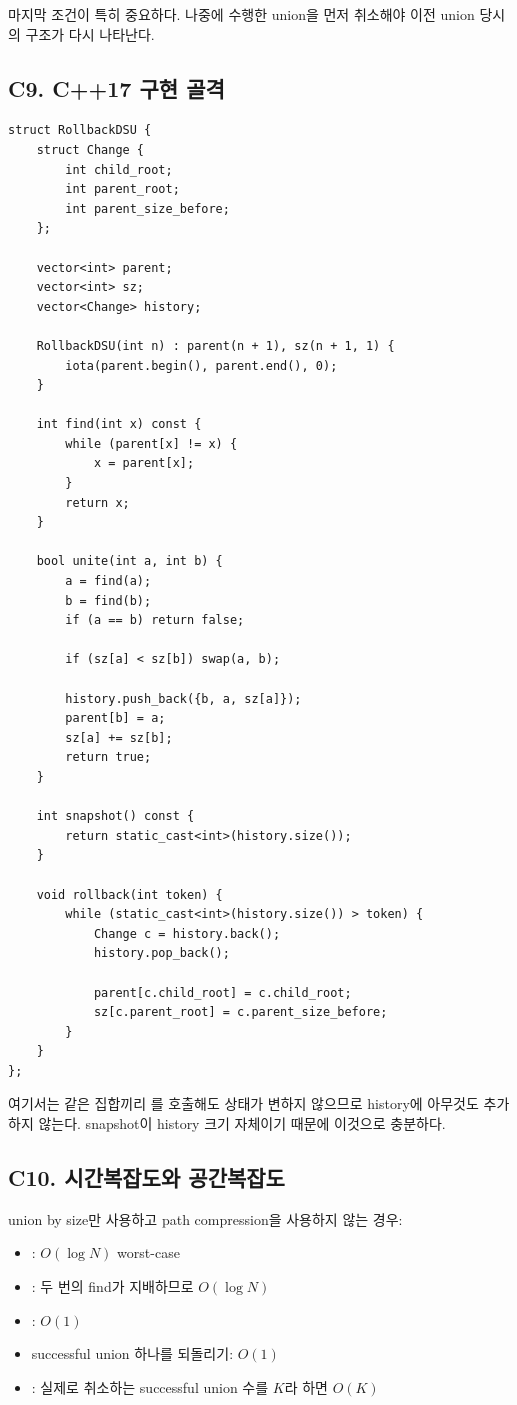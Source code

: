 마지막 조건이 특히 중요하다. 나중에 수행한 union을 먼저 취소해야 이전 union 당시의 구조가 다시 나타난다.

\subsection{C9. C++17 구현 골격}
\begin{lstlisting}
struct RollbackDSU {
    struct Change {
        int child_root;
        int parent_root;
        int parent_size_before;
    };

    vector<int> parent;
    vector<int> sz;
    vector<Change> history;

    RollbackDSU(int n) : parent(n + 1), sz(n + 1, 1) {
        iota(parent.begin(), parent.end(), 0);
    }

    int find(int x) const {
        while (parent[x] != x) {
            x = parent[x];
        }
        return x;
    }

    bool unite(int a, int b) {
        a = find(a);
        b = find(b);
        if (a == b) return false;

        if (sz[a] < sz[b]) swap(a, b);

        history.push_back({b, a, sz[a]});
        parent[b] = a;
        sz[a] += sz[b];
        return true;
    }

    int snapshot() const {
        return static_cast<int>(history.size());
    }

    void rollback(int token) {
        while (static_cast<int>(history.size()) > token) {
            Change c = history.back();
            history.pop_back();

            parent[c.child_root] = c.child_root;
            sz[c.parent_root] = c.parent_size_before;
        }
    }
};
\end{lstlisting}

여기서는 같은 집합끼리 를 호출해도 상태가 변하지 않으므로 history에 아무것도 추가하지 않는다. snapshot이 history 크기 자체이기 때문에 이것으로 충분하다.

\subsection{C10. 시간복잡도와 공간복잡도}
union by size만 사용하고 path compression을 사용하지 않는 경우:
\begin{itemize}
\item {}: $O(\log N)$ worst-case
\item {}: 두 번의 find가 지배하므로 $O(\log N)$
\item {}: $O(1)$
\item successful union 하나를 되돌리기: $O(1)$
\item {}: 실제로 취소하는 successful union 수를 $K$라 하면 $O(K)$
\end{itemize}

